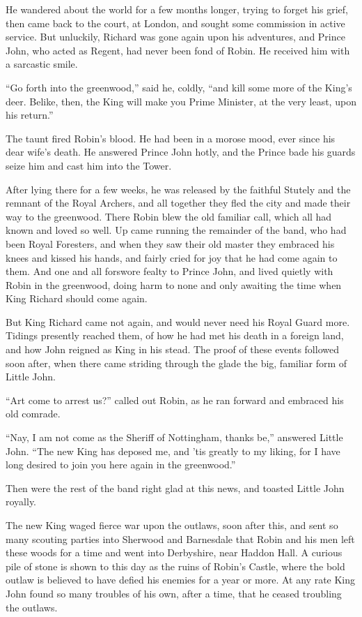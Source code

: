 He wandered about the world for a few months longer, trying to forget
his grief, then came back to the court, at London, and sought some
commission in active service. But unluckily, Richard was gone again upon
his adventures, and Prince John, who acted as Regent, had never been
fond of Robin. He received him with a sarcastic smile.

``Go forth into the greenwood,'' said he, coldly, ``and kill some more
of the King's deer. Belike, then, the King will make you Prime Minister,
at the very least, upon his return.''

The taunt fired Robin's blood. He had been in a morose mood, ever since
his dear wife's death. He answered Prince John hotly, and the Prince
bade his guards seize him and cast him into the Tower.

After lying there for a few weeks, he was released by the faithful
Stutely and the remnant of the Royal Archers, and all together they fled
the city and made their way to the greenwood. There Robin blew the old
familiar call, which all had known and loved so well. Up came running
the remainder of the band, who had been Royal Foresters, and when they
saw their old master they embraced his knees and kissed his hands, and
fairly cried for joy that he had come again to them. And one and all
forswore fealty to Prince John, and lived quietly with Robin in the
greenwood, doing harm to none and only awaiting the time when King
Richard should come again.

But King Richard came not again, and would never need his Royal Guard
more. Tidings presently reached them, of how he had met his death in a
foreign land, and how John reigned as King in his stead. The proof of
these events followed soon after, when there came striding through the
glade the big, familiar form of Little John.

``Art come to arrest us?'' called out Robin, as he ran forward and
embraced his old comrade.

``Nay, I am not come as the Sheriff of Nottingham, thanks be,'' answered
Little John. ``The new King has deposed me, and 'tis greatly to my
liking, for I have long desired to join you here again in the
greenwood.''

Then were the rest of the band right glad at this news, and toasted
Little John royally.

The new King waged fierce war upon the outlaws, soon after this, and
sent so many scouting parties into Sherwood and Barnesdale that Robin
and his men left these woods for a time and went into Derbyshire, near
Haddon Hall. A curious pile of stone is shown to this day as the ruins
of Robin's Castle, where the bold outlaw is believed to have defied his
enemies for a year or more. At any rate King John found so many troubles
of his own, after a time, that he ceased troubling the outlaws.

